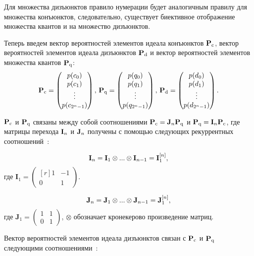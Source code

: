 Для множества дизъюнктов правило нумерации будет аналогичным правилу для множества конъюнктов, следовательно, существует биективное отображение множества квантов и на множество дизъюнктов.

Теперь введем вектор вероятностей элементов идеала конъюнктов $\mathbf{P}_\mathrm{c}$, вектор вероятностей элементов идеала дизъюнктов $\mathbf{P}_\mathrm{d}$ и   вектор вероятностей элементов множества квантов $\mathbf{P}_\mathrm{q}$: 
\begin{equation*}
\mathbf{P}_\mathrm{c} = \begin{pmatrix}
	    p(c_0)  \\ p(c_1) \\ \vdots \\  p(c_{2^n-1})
      \end{pmatrix}, \,
\mathbf{P}_\mathrm{q} = \begin{pmatrix}
	    p(q_0)  \\ p(q_1) \\ \vdots \\  p(q_{2^n-1})
      \end{pmatrix}, \,
\mathbf{P}_\mathrm{d} = \begin{pmatrix}
	    p(d_0)  \\ p(d_1) \\ \vdots \\  p(d_{2^n-1})
      \end{pmatrix}. 
\end{equation*}

$\mathbf{P}_\mathrm{c}$ и $\mathbf{P}_\mathrm{q}$ связаны между собой соотношениями $\mathbf{P}_\mathrm{c} = \mathbf{J}_n\mathbf{P}_\mathrm{q}$ и $\mathbf{P}_\mathrm{q} = \mathbf{I}_n\mathbf{P}_\mathrm{c}$, где матрицы перехода $\mathbf{I}_n$ и $\mathbf{J}_n$ получены с помощью следующих рекуррентных соотношений~\cite{109}:

\begin{equation*}
    \mathbf{I}_n = \mathbf{I}_1 \otimes ... \otimes \mathbf{I}_{n-1} = \mathbf{I}_1^{[n]},
\end{equation*}
где $\mathbf{I}_1 = \begin{pmatrix*}[r] 1 & -1 \\ 0 & 1 \end{pmatrix*}$.

\begin{equation*}
    \mathbf{J}_n = \mathbf{J}_1 \otimes ... \otimes \mathbf{J}_{n-1} = \mathbf{J}_1^{[n]},
\end{equation*}
где $\mathbf{J}_1 = \begin{pmatrix} 1 & 1 \\ 0 & 1 \end{pmatrix}$, $\otimes$ обозначает кронекерово произведение матриц.

Вектор вероятностей элементов идеала дизъюнктов связан с $\mathbf{P}_\mathrm{c}$ и $\mathbf{P}_\mathrm{q}$ следующими соотношениями~\cite{76}:

